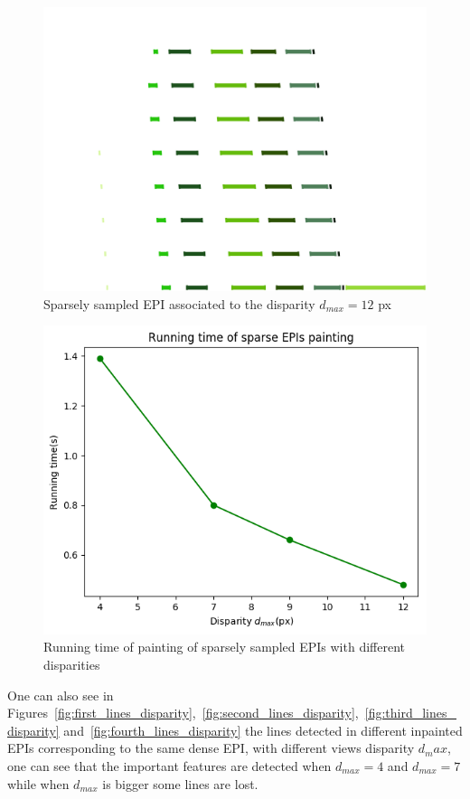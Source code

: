 \begin{itemize}
\begin{figure}[h!]
\centering
\includegraphics[width = 0.7 \textwidth]{./Diagrams/results/Disparity_benchmark/673_10_102_12_48_8_sparse.png}
\caption{Sparsely sampled EPI associated to the disparity $d_{max}=12$ px}
\label{fig:fourth_sparse_disparity}
\end{figure}

\begin{figure}[h!]
\centering
\includegraphics[width = 0.7 \textwidth]{./Diagrams/results/Disparity_benchmark/sparse_painting_benchmark.png}
\caption{Running time of painting of sparsely sampled EPIs with different disparities}
\label{fig:benchmark_line}
\end{figure}


\bigskip

One can also see in Figures~\ref{fig:first_lines_disparity},~\ref{fig:second_lines_disparity},~\ref{fig:third_lines_disparity} and~\ref{fig:fourth_lines_disparity} the lines detected in different inpainted EPIs corresponding to the same dense EPI, with different views disparity $d_max$, one can see that the important features are detected when $d_{max}=4$ and $d_{max}=7$ while when $d_{max}$ is bigger some lines are lost. 


\end{itemize}
